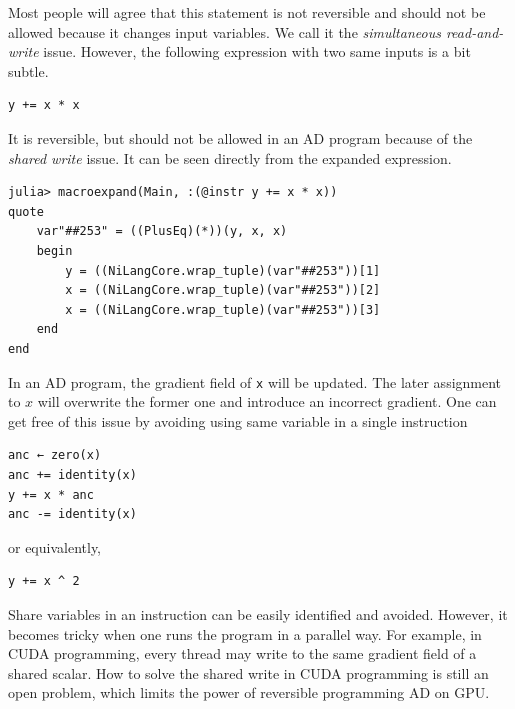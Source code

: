 \documentclass{article}
\newcommand{\<}{\langle}
\renewcommand{\>}{\rangle}
\theoremstyle{definition}\newtheorem{definition}{\textit{Definition}}
\begin{document}
Most people will agree that this statement is not reversible and should not be allowed because it changes input variables.
We call it the \textit{simultaneous read-and-write} issue.
However, the following expression with two same inputs is a bit subtle.

\begin{minipage}{.88\columnwidth}
\begin{lstlisting}
y += x * x
\end{lstlisting}
\end{minipage}

It is reversible, but should not be allowed in an AD program because of the \textit{shared write} issue.
It can be seen directly from the expanded expression.

\begin{minipage}{.88\columnwidth}
\begin{lstlisting}
julia> macroexpand(Main, :(@instr y += x * x))
quote
    var"##253" = ((PlusEq)(*))(y, x, x)
    begin
        y = ((NiLangCore.wrap_tuple)(var"##253"))[1]
        x = ((NiLangCore.wrap_tuple)(var"##253"))[2]
        x = ((NiLangCore.wrap_tuple)(var"##253"))[3]
    end
end
\end{lstlisting}
\end{minipage}

In an AD program, the gradient field of \texttt{x} will be updated.
The later assignment to $x$ will overwrite the former one and introduce an incorrect gradient.
One can get free of this issue by avoiding using same variable in a single instruction

\begin{minipage}{.88\columnwidth}
\begin{lstlisting}
anc ← zero(x)
anc += identity(x)
y += x * anc
anc -= identity(x)
\end{lstlisting}
\end{minipage}

or equivalently,

\begin{minipage}{.88\columnwidth}
\begin{lstlisting}
y += x ^ 2
\end{lstlisting}
\end{minipage}

Share variables in an instruction can be easily identified and avoided.
However, it becomes tricky when one runs the program in a parallel way.
For example, in CUDA programming, every thread may write to the same gradient field of a shared scalar.
How to solve the shared write in CUDA programming is still an open problem, which limits the power of reversible programming AD on GPU.
\end{document}
